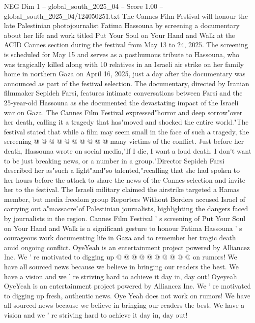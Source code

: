 \begin{textsample}{NEG Dim 1 – global\_south\_2025\_04 – Score 1.00 – global\_south\_2025\_04/124050251.txt}  \label{ex:f1_neg_166}
The Cannes Film Festival will honour the late Palestinian photojournalist Fatima Hassouna by screening a documentary about her life and work titled Put Your Soul on Your Hand and Walk at the ACID Cannes section during the festival from May 13 to 24, 2025.
The screening is scheduled for May 15 and serves as a posthumous tribute to Hassouna, who was tragically killed along with 10 relatives in an Israeli air strike on her family home in northern Gaza on April 16, 2025, just a day after the documentary was announced as part of the festival selection.
The documentary, directed by Iranian filmmaker Sepideh Farsi, features intimate conversations between Farsi and the 25-year-old Hassouna as she documented the devastating impact of the Israeli war on Gaza.
The Cannes Film Festival expressed"horror and deep sorrow"over her death, calling it a tragedy that has"moved and shocked the entire world."The festival stated that while a film may seem small in the face of such a tragedy, the screening @ @ @ @ @ @ @ @ @ @ many victims of the conflict.
Just before her death, Hassouna wrote on social media,"If I die, I want a loud death.
I don't want to be just breaking news, or a number in a group."Director Sepideh Farsi described her as"such a light"and"so talented,"recalling that she had spoken to her hours before the attack to share the news of the Cannes selection and invite her to the festival.
The Israeli military claimed the airstrike targeted a Hamas member, but media freedom group Reporters Without Borders accused Israel of carrying out a"massacre"of Palestinian journalists, highlighting the dangers faced by journalists in the region.
Cannes Film Festival ' s screening of Put Your Soul on Your Hand and Walk is a significant gesture to honour Fatima Hassouna ' s courageous work documenting life in Gaza and to remember her tragic death amid ongoing conflict.
OyeYeah is an entertainment project powered by Alliancez Inc.
We ' re motivated to digging up @ @ @ @ @ @ @ @ @ @ on rumors!
We have all sourced news because we believe in bringing our readers the best.
We have a vision and we ' re striving hard to achieve it day in, day out!
Oyeyeah OyeYeah is an entertainment project powered by Alliancez Inc.
We ' re motivated to digging up fresh, authentic news.
Oye Yeah does not work on rumors!
We have all sourced news because we believe in bringing our readers the best.
We have a vision and we ' re striving hard to achieve it day in, day out!

\end{textsample}
